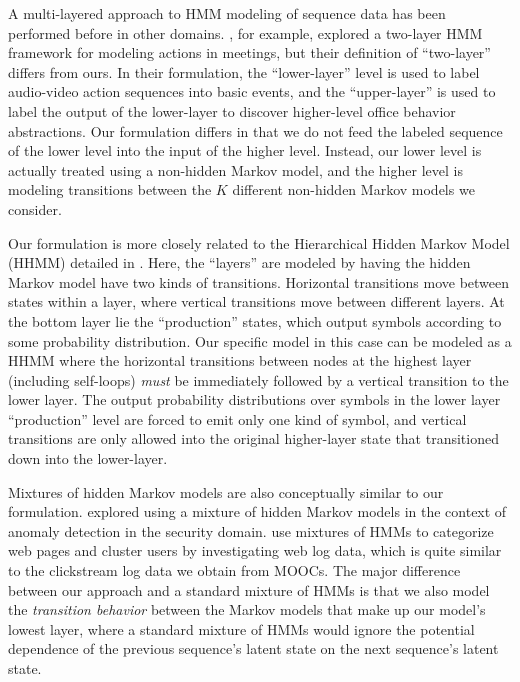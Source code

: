 A multi-layered approach to HMM modeling of sequence data has been
performed before in other domains. \citet{Zhang:2004:CVPR}, for example,
explored a two-layer HMM framework for modeling actions in meetings, but
their definition of ``two-layer'' differs from ours. In their formulation,
the ``lower-layer'' level is used to label audio-video action sequences
into basic events, and the ``upper-layer'' is used to label the output of
the lower-layer to discover higher-level office behavior abstractions. Our
formulation differs in that we do not feed the labeled sequence of the
lower level into the input of the higher level. Instead, our lower level is
actually treated using a non-hidden Markov model, and the higher level is
modeling transitions between the $K$ different non-hidden Markov models we
consider.

Our formulation is more closely related to the Hierarchical Hidden Markov
Model (HHMM) detailed in \citet{Fine:1998:ML}. Here, the ``layers'' are
modeled by having the hidden Markov model have two kinds of transitions.
Horizontal transitions move between states within a layer, where vertical
transitions move between different layers. At the bottom layer lie the
``production'' states, which output symbols according to some probability
distribution. Our specific model in this case can be modeled as a HHMM
where the horizontal transitions between nodes at the highest layer
(including self-loops) \emph{must} be immediately followed by a vertical
transition to the lower layer. The output probability distributions over
symbols in the lower layer ``production'' level are forced to emit only one
kind of symbol, and vertical transitions are only allowed into the original
higher-layer state that transitioned down into the lower-layer.

Mixtures of hidden Markov models are also conceptually similar to our
formulation. \citet{Song:2009:NDSS} explored using a mixture of hidden
Markov models in the context of anomaly detection in the security domain.
\citet{Ypma:2002:Springer} use mixtures of HMMs to categorize web pages and
cluster users by investigating web log data, which is quite similar to the
clickstream log data we obtain from MOOCs. The major difference between
our approach and a standard mixture of HMMs is that we also model the
\emph{transition behavior} between the Markov models that make up our
model's lowest layer, where a standard mixture of HMMs would ignore the
potential dependence of the previous sequence's latent state on the next
sequence's latent state.

